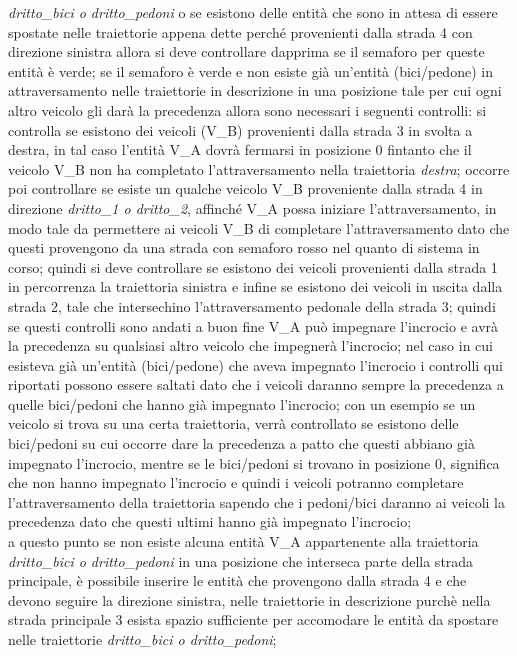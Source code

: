 \begin{enumerate}
\begin{enumerate}
\textit{drit\-to\_bi\-ci o drit\-to\_pe\-do\-ni} o se esistono delle entità che
sono in attesa di essere spostate nelle traiettorie appena dette perché
provenienti dalla strada 4 con direzione sinistra allora si deve controllare dapprima se il semaforo per queste entità è verde; se il semaforo è verde e non esiste già un'entità (bici/pedone) in attraversamento nelle traiettorie in descrizione in una posizione tale per cui ogni altro veicolo gli darà la precedenza allora sono necessari i seguenti controlli: si controlla se esistono dei veicoli (V\_B) provenienti dalla strada 3 in svolta a destra, in tal caso l'entità V\_A dovrà fermarsi in posizione 0 fintanto che il veicolo V\_B non ha completato l'attraversamento nella traiettoria \textit{destra}; occorre poi controllare se esiste un qualche veicolo V\_B proveniente dalla strada 4 in direzione \textit{dritto\_1 o dritto\_2}, affinché V\_A possa iniziare l'attraversamento, in modo tale da permettere ai veicoli V\_B di completare l'attraversamento dato che questi provengono da una strada con semaforo rosso nel quanto di sistema in corso; quindi si deve controllare se esistono dei veicoli provenienti dalla strada 1 in percorrenza la traiettoria sinistra e infine se esistono dei veicoli in uscita dalla strada 2, tale che intersechino l'attraversamento pedonale della strada 3; quindi se questi controlli sono andati a buon fine V\_A può impegnare l'incrocio e avrà la precedenza su qualsiasi altro veicolo che impegnerà l'incrocio; nel caso in cui esisteva già un'entità (bici/pedone) che aveva impegnato l'incrocio i controlli qui riportati possono essere saltati dato che i veicoli daranno sempre la precedenza a quelle bici/pedoni che hanno già impegnato l'incrocio; con un esempio se un veicolo si trova su una certa traiettoria, verrà controllato se esistono delle bici/pedoni su cui occorre dare la precedenza a patto che questi abbiano già impegnato l'incrocio, mentre se le bici/pedoni si trovano in posizione 0, significa che non hanno impegnato l'incrocio e quindi i veicoli potranno completare l'attraversamento della traiettoria sapendo che i pedoni/bici daranno ai veicoli la precedenza dato che questi ultimi hanno già impegnato l'incrocio; \\
a questo punto se non esiste alcuna entità V\_A appartenente alla traiettoria \textit{drit\-to\_bi\-ci o drit\-to\_pe\-do\-ni} in una posizione che interseca parte della strada principale, è possibile inserire le entità che provengono dalla strada 4 e che devono seguire la direzione sinistra, nelle traiettorie in descrizione purchè nella strada principale 3 esista spazio sufficiente per accomodare le entità da spostare nelle traiettorie \textit{drit\-to\_bi\-ci o drit\-to\_pe\-do\-ni}; \\

\end{enumerate}
\end{enumerate}
